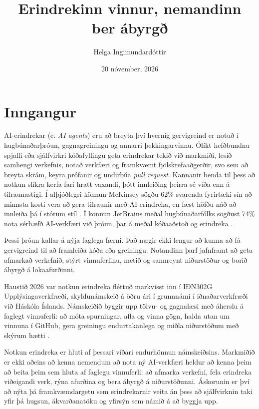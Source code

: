 \documentclass{kennsluakademia_conf}
\date{20 nóvember, 2026}
\title{Erindrekinn vinnur, nemandinn ber ábyrgð}
\author{%
Helga Ingimundardóttir\autid{}{0000-0002-2780-3546}%
}
\affil{}{Iðnaðarverkfræði-, vélaverkfræði- og tölvunarfræðideild
(IVT), Háskóli Íslands}
\begin{document}
\maketitle


\section{Inngangur}\label{inngangur}

AI-erindrekar (e. \emph{AI agents}) eru að breyta því hvernig
gervigreind er notuð í hugbúnaðarþróun, gagnagreiningu og annarri
þekkingarvinnu. Ólíkt hefðbundnu spjalli eða sjálfvirkri kóðafyllingu
geta erindrekar tekið við markmiði, lesið samhengi verkefnis, notað
verkfæri og framkvæmt fjölskrefaaðgerðir, svo sem að breyta skrám, keyra
prófanir og undirbúa \emph{pull request}. Kannanir benda til þess að
notkun slíkra kerfa fari hratt vaxandi, þótt innleiðing þeirra sé víða
enn á tilraunastigi. Í alþjóðlegri könnun McKinsey sögðu 62\% svarenda
fyrirtæki sín að minnsta kosti vera að gera tilraunir með AI-erindreka,
en fæst höfðu náð að innleiða þá í stórum stíl \citep{mckinsey2025}. Í
könnun JetBrains meðal hugbúnaðarfólks sögðust 74\% nota sérhæfð
AI-verkfæri við þróun, þar á meðal kóðaaðstoð og erindreka
\citep{jetbrains2026}.

Þessi þróun kallar á nýja faglega færni. Það nægir ekki lengur að kunna
að fá gervigreind til að framleiða kóða eða greiningu. Notandinn þarf
jafnframt að geta afmarkað verkefnið, stýrt vinnuferlinu, metið og
sannreynt niðurstöður og borið ábyrgð á lokaafurðinni.

Haustið 2026 var notkun erindreka fléttuð markvisst inn í IÐN302G
Upplýsingaverkfræði, skyldunámskeið á öðru ári í grunnnámi í
iðnaðarverkfræði við Háskóla Íslands. Námskeiðið byggir upp tölvu- og
gagnalæsi með áherslu á faglegt vinnuferli: að móta spurningar, afla og
vinna gögn, halda utan um vinnuna í GitHub, gera greiningu
endurtakanlega og miðla niðurstöðum með skýrum hætti
\citep{ingimundardottir2026endurhonnun}.

Notkun erindreka er hluti af þessari víðari endurhönnun námskeiðsins.
Markmiðið er ekki aðeins að kenna nemendum að nota ný AI-verkfæri heldur
að kenna þeim að beita þeim sem hluta af faglegu vinnuferli: að afmarka
verkefni, fela erindreka viðeigandi verk, rýna afurðina og bera ábyrgð á
niðurstöðunni. Áskorunin er því að nýta þá framkvæmdargetu sem
erindrekarnir veita án þess að sjálfvirknin taki yfir þá hugsun,
ákvarðanatöku og yfirsýn sem námið á að byggja upp.
\end{document}
